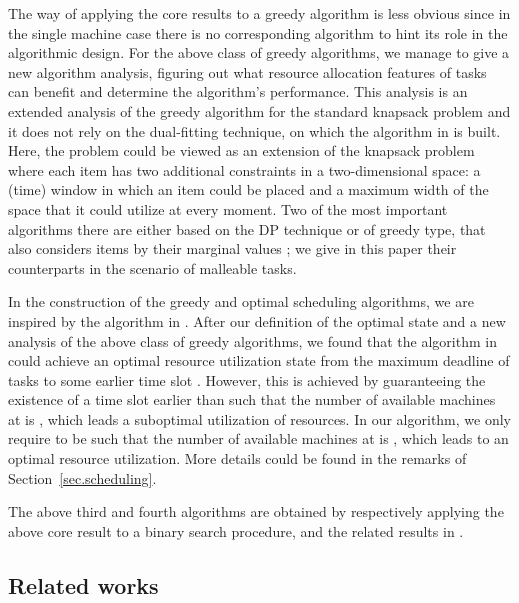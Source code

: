 \documentclass[10pt,journal,compsoc]{IEEEtran}
\begin{document}
The way of applying the core results to a greedy algorithm is less obvious since in the single machine case there is no corresponding algorithm to hint its role in the algorithmic design. For the above class of greedy algorithms, we manage to give a new algorithm analysis, figuring out what resource allocation features of tasks can benefit and determine the algorithm's performance. This analysis is an extended analysis of the greedy algorithm for the standard knapsack problem \cite{Brassard} and it does not rely on the dual-fitting technique, on which the algorithm in \cite{Jain} is built.
Here, the problem could be viewed as an extension of the knapsack problem where each item has two additional constraints in a two-dimensional space: a (time) window in which an item could be placed and a maximum width of the space that it could utilize at every moment. Two of the most important algorithms there are either based on the DP technique or of greedy type, that also considers items by their marginal values \cite{Brassard}; we give in this paper their counterparts in the scenario of malleable tasks.


In the construction of the greedy and optimal scheduling algorithms, we are inspired by the algorithm in \cite{Jain}. After our definition of the optimal state and a new analysis of the above class of greedy algorithms, we found that the algorithm in \cite{Jain} could achieve an optimal resource utilization state from the maximum deadline of tasks  to some earlier time slot . However, this is achieved by guaranteeing the existence of a time slot  earlier than  such that the number of available machines at  is , which leads a suboptimal utilization of resources. In our algorithm, we only require  to be such that the number of available machines at  is , which leads to an optimal resource utilization. More details could be found in the remarks of Section~\ref{sec.scheduling}.


The above third and fourth algorithms are obtained by respectively applying the above core result to a binary search procedure, and the related results in \cite{Nagarajan}.













\subsection{Related works}
\label{sec.related-work}
\end{document}
